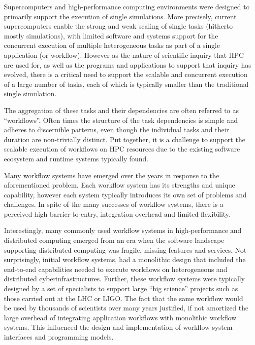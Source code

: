 

Supercomputers and high-performance computing environments were designed to
primarily support the execution of single simulations. More precisely, current
supercomputers enable the strong and weak scaling of single tasks (hitherto
mostly simulations), with limited software and systems support for the
concurrent execution of multiple heterogeneous tasks as part of a single
application (or workflow). However as the nature of scientific inquiry that
HPC are used for, as well as the programs and applications to support that
inquiry has evolved, there is a critical need to support the scalable and
concurrent execution of a large number of tasks, each of which is typically
smaller than the traditional single simulation.

The aggregation of these tasks and their dependencies are often referred to as
``workflows''. Often times the structure of the task dependencies is simple and
adheres to discernible patterns, even though the individual tasks and their
duration are non-trivially distinct. Put together, it is a challenge to
support the scalable execution of workflows on HPC resources due to the
existing software ecosystem and runtime systems typically found.

Many workflow systems have emerged over the years in response to the
aforementioned problem. Each workflow system has its strengths and unique
capability, however each system typically introduces its own set of problems
and challenges. In spite of the many successes of workflow systems, there is a
perceived high barrier-to-entry, integration overhead and limited flexibility.

Interestingly, many commonly used workflow systems in high-performance and
distributed computing emerged from an era when the software landscape
supporting distributed computing was fragile, missing features and services.
Not surprisingly, initial workflow systems, had a monolithic design that
included the end-to-end capabilities needed to execute workflows on
heterogeneous and distributed cyberinfrastructures. Further, these workflow
systems were typically designed by a set of specialists to support large ``big
science'' projects such as those carried out at the LHC or LIGO. The fact that
the same workflow would be used by thousands of scientists over many years
justified, if not amortized the large overhead of integrating application
workflows with monolithic workflow systems. This influenced the design and
implementation of workflow system interfaces and programming models.

